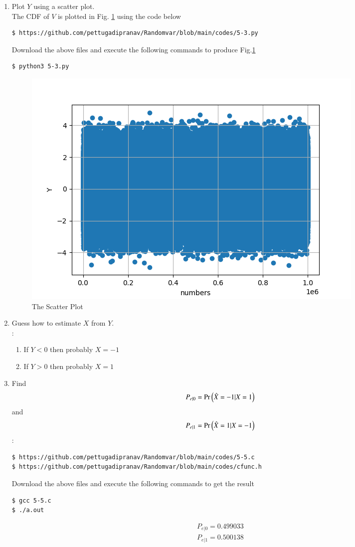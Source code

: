 \documentclass[journal,12pt,twocolumn]{IEEEtran}
\renewcommand\thesection{\arabic{section}}
\begin{document}
\begin{enumerate}[label=\thesection.\arabic*
,ref=\thesection.\theenumi]
	\item Plot $Y$ using a scatter plot.\\
	\solution
	The CDF of $V$ is plotted in Fig. \ref{fig:5.3} using the code below
\begin{lstlisting}
$ https://github.com/pettugadipranav/Randomvar/blob/main/codes/5-3.py
\end{lstlisting}
Download the above files and execute the following commands to produce Fig.\ref{fig:5.3}
\begin{lstlisting}
$ python3 5-3.py
\end{lstlisting}
\begin{figure}[!h]
\centering
\includegraphics[width=\columnwidth]{./figs/5-3.png}
\caption{The Scatter Plot}
\label{fig:5.3}
\end{figure}

\item Guess how to estimate $X$ from $Y$.\\
	\solution:
	\begin{enumerate}
	    \item If $Y<0$ then probably $X=-1$
	    \item If $Y>0$ then probably $X=1$
	\end{enumerate}
\label{ml-ch4_sim}

\item Find 
\begin{equation}
	P_{e|0} = \Pr\left(\hat{X} = -1|X=1\right)
\end{equation}
and 
\begin{equation}
	P_{e|1} = \Pr\left(\hat{X} = 1|X=-1\right)
\end{equation}
	\solution:
\begin{lstlisting}
$ https://github.com/pettugadipranav/Randomvar/blob/main/codes/5-5.c
$ https://github.com/pettugadipranav/Randomvar/blob/main/codes/cfunc.h
\end{lstlisting}
Download the above files and execute the following commands to get the result
\begin{lstlisting}
$ gcc 5-5.c
$ ./a.out
\end{lstlisting}
\begin{align}
P_{e|0}=0.499033\\
P_{e|1}=0.500138
\end{align}




\end{enumerate}
\end{document}
